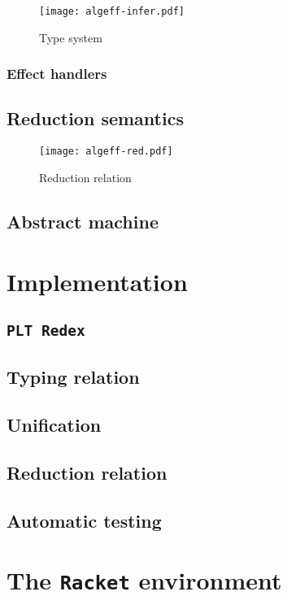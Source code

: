 \documentclass[inz, english, shortabstract]{iithesis}
\newcommand{\Redex}{\texttt{PLT Redex} }
\newcommand{\Racket}{\texttt{Racket} }
\begin{document}
\begin{figure}
  \centering
  \texttt{[image: algeff-infer.pdf]}
  \caption{Type system} 
  \label{fig:algeff-infer}
\end{figure}

\subsection{Effect handlers}


\section{Reduction semantics}
\begin{figure}
  \centering
  \texttt{[image: algeff-red.pdf]} 
  \caption{Reduction relation} 
  \label{fig:algeff-red}
\end{figure}


\section{Abstract machine}


\chapter{Implementation}\label{ch:implementation}

\section{\Redex}

\section{Typing relation}

\section{Unification}

\section{Reduction relation}

\section{Automatic testing}


\chapter{The \Racket environment}\label{ch:racket}
\end{document}
